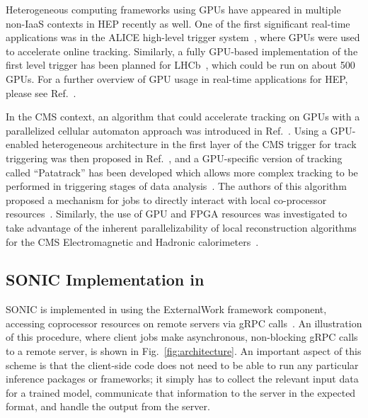 Heterogeneous computing frameworks using GPUs have appeared in multiple non-IaaS contexts in HEP recently as well. One of the first significant real-time applications was in the ALICE high-level trigger system~\cite{ALICE:2018phe}, where GPUs were used to accelerate online tracking. Similarly, a fully GPU-based implementation of the first level trigger has been planned for LHCb~\cite{Aaij:2019zbu}, which could be run on about 500 GPUs. For a further overview of GPU usage in real-time applications for HEP, please see Ref.~\cite{VomBruch:2020plx}.

In the CMS context, an algorithm that could accelerate tracking on GPUs with a parallelized cellular automaton approach was introduced in Ref.~\cite{Funke:2014dga}. Using a GPU-enabled heterogeneous architecture in the first layer of the CMS trigger for track triggering was then proposed in Ref.~\cite{Pantaleo:2016ery}, and a GPU-specific version of tracking called ``Patatrack'' has been developed which allows more complex tracking to be performed in triggering stages of data analysis~\cite{Bocci:2020pmi}. The authors of this algorithm proposed a mechanism for \CMSSW jobs to directly interact with local co-processor resources~\cite{Bocci:2020olh}. Similarly, the use of GPU and FPGA resources was investigated to take advantage of the inherent parallelizability of local reconstruction algorithms for the CMS Electromagnetic and Hadronic calorimeters~\cite{Massironi_2020}.%

\subsection{SONIC Implementation in \CMSSW}
SONIC is implemented in \CMSSW using the ExternalWork framework component, accessing coprocessor resources on remote servers via gRPC calls~\cite{gRPC}. An illustration of this procedure, where client jobs make asynchronous, non-blocking gRPC calls to a remote server, is shown in Fig.~\ref{fig:architecture}. An important aspect of this scheme is that the client-side code does not need to be able to run any particular inference packages or frameworks; it simply has to collect the relevant input data for a trained model, communicate that information to the server in the expected format, and handle the output from the server.

